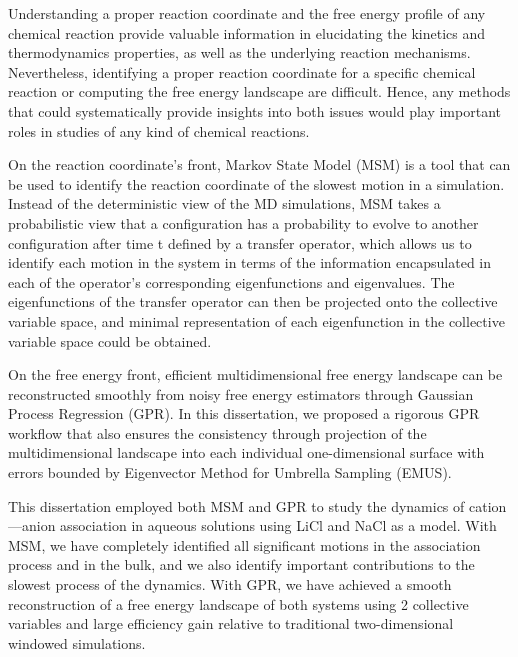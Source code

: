 \begin{spacing}{2.0}
    Understanding a proper reaction coordinate and the free energy profile of any chemical reaction provide valuable information in elucidating 
    the kinetics and thermodynamics properties, as well as the underlying reaction mechanisms. Nevertheless, identifying a proper reaction 
    coordinate for a specific chemical reaction or computing the free energy landscape are difficult. Hence, any methods that could systematically 
    provide insights into both issues would play important roles in studies of any kind of chemical reactions.

    On the reaction coordinate’s front, Markov State Model (MSM) is a tool that can be used to identify the reaction coordinate of the slowest 
    motion in a simulation. Instead of the deterministic view of the MD simulations, MSM takes a probabilistic view that a configuration has a 
    probability to evolve to another configuration after time t defined by a transfer operator, which allows us to identify each motion in the 
    system in terms of the information encapsulated in each of the operator’s corresponding eigenfunctions and eigenvalues. The eigenfunctions 
    of the transfer operator can then be projected onto the collective variable space, and minimal representation of each eigenfunction in the 
    collective variable space could be obtained.

    On the free energy front, efficient multidimensional free energy landscape can be reconstructed smoothly from noisy free energy estimators 
    through Gaussian Process Regression (GPR). In this dissertation, we proposed a rigorous GPR workflow that also ensures the consistency through 
    projection of the multidimensional landscape into each individual one-dimensional surface with errors bounded by Eigenvector Method for 
    Umbrella Sampling (EMUS).

    This dissertation employed both MSM and GPR to study the dynamics of cation---anion association in aqueous solutions using LiCl and NaCl as 
    a model. With MSM, we have completely identified all significant motions in the association process and in the bulk, and we also identify 
    important contributions to the slowest process of the dynamics. With GPR, we have achieved a smooth reconstruction of a free energy landscape 
    of both systems using 2 collective variables and large efficiency gain relative to traditional two-dimensional windowed simulations. 
\end{spacing}
